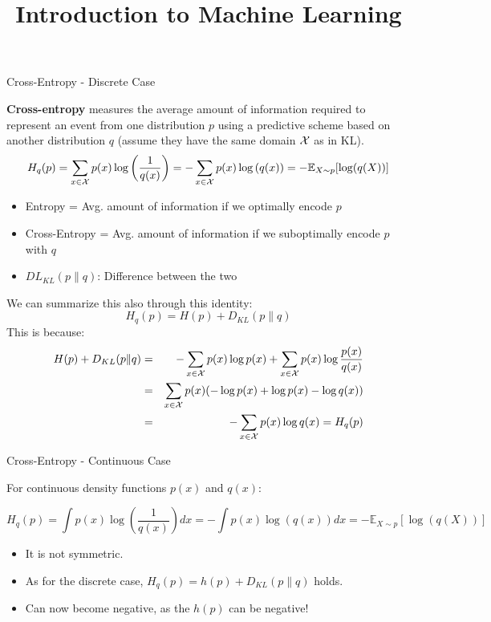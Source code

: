 \documentclass[11pt,compress,t,notes=noshow, xcolor=table]{beamer}
\title{Introduction to Machine Learning}
\date{}
\begin{document}


\begin{vbframe} {Cross-Entropy - Discrete Case}

\textbf{Cross-entropy} measures the average amount of information required to represent an event from one distribution $p$ using a predictive scheme based on another distribution $q$ (assume they have the same domain $\mathcal{X}$ as in KL).
  $$ H_q(p) = \sum_{x \in \mathcal{X}} p(x) \log\left(\frac{1}{q(x)}\right) = - \sum_{x \in \mathcal{X}} p(x) \log\left(q(x)\right) = - \mathbb{E}_{X\sim p}[\log(q(X))]$$


\begin{itemize}
\setlength{\itemsep}{1.2em}
\item Entropy = Avg. amount of information if we optimally encode $p$
\item Cross-Entropy = Avg. amount of information if we suboptimally encode $p$ with $q$
\item $DL_ {KL}(p \| q)$: Difference between the two
\end{itemize}

\lz

We can summarize this also through this identity: 
\lz
$$
H_q(p) = H(p) + D_{KL}(p \| q)
$$
This is because: 
\begin{eqnarray*}
H(p) + D_{KL}(p \| q) &=& - \sum_{x \in \mathcal{X}} p(x) \log p(x) + \sum_{x \in \mathcal{X}} p(x) \log \frac{p(x)}{q(x)} \\
                      &=& \sum_{x \in \mathcal{X}} p(x) (-\log p(x) +  \log p(x) - \log q(x)) \\
&=& - \sum_{x \in \mathcal{X}} p(x) \log q(x) = H_q(p) \\
\end{eqnarray*}
   
\framebreak
\end{vbframe}

\begin{vbframe} {Cross-Entropy - Continuous Case}

For continuous density functions $p(x)$ and $q(x)$: 

$$ H_q(p) = \int p(x) \log\left(\frac{1}{q(x)}\right) dx = - \int p(x) \log\left(q(x)\right) dx = - \mathbb{E}_{X \sim p}[\log(q(X))]$$

\begin{itemize}
\item It is not symmetric.
\item As for the discrete case, $H_q(p) = h(p) + D_{KL}(p \| q)$ holds.
\item Can now become negative, as the $h(p)$ can be negative! 
\end{itemize}
\end{vbframe}
 
\end{document}
